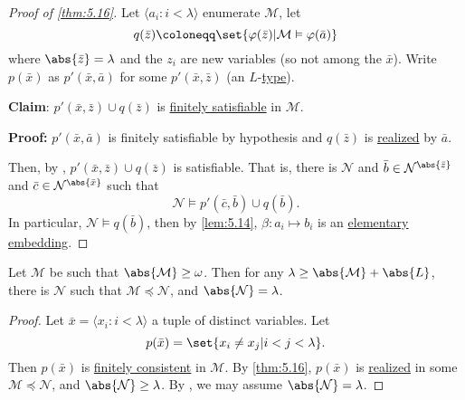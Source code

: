 \documentclass{article}
\let\models\vDash
\begin{document}
\begin{proof}[Proof of \cref{thm:5.16}]
  Let $\langle a_i : i < \lambda \rangle$ enumerate $\mathcal{M}$, let
  \begin{equation*}q(\bar{z}) \coloneqq \set{\varphi(\bar{z}) | \mathcal{M} \models \varphi(\bar{a})}\end{equation*}
  where $\abs{\bar{z}} = \lambda$ and the $z_i$ are new variables (so not among the $\bar{x}$).
  Write $p(\bar{x})$ as $p'(\bar{x}, \bar{a})$ for some $p'(\bar{x}, \bar{z})$ (an $L$-\hyperlink{def:type}{type}).

  \textbf{Claim}: $p'(\bar{x},\bar{z}) \cup q(\bar{z})$ is \hyperlink{def:type}{finitely satisfiable} in $\mathcal{M}$.

  \textbf{Proof:} $p'(\bar{x},\bar{a})$ is finitely satisfiable by hypothesis and $q(\bar{z})$ is \hyperlink{def:type}{realized} by $\bar{a}$.

  Then, by , $p'(\bar{x}, \bar{z}) \cup q(\bar{z})$ is satisfiable.
  That is, there is $\mathcal{N}$ and $\bar{b} \in \mathcal{N}^{\abs{\bar{z}}}$ and $\bar{c} \in \mathcal{N}^{\abs{\bar{x}}}$ such that
  \begin{equation*}
    \mathcal{N} \models p'(\bar{c}, \bar{b}) \cup q(\bar{b}).
  \end{equation*}
  In particular, $\mathcal{N} \models q(\bar{b})$, then by \cref{lem:5.14}, $\beta: a_i \mapsto b_i$ is an \hyperlink{def:el}{elementary embedding}.
\end{proof}
\begin{nthm}\label{thm:5.17}
  Let $\mathcal{M}$ be such that $\abs{\mathcal{M}} \geq \omega$.
  Then for any $\lambda \geq \abs{\mathcal{M}} + \abs{L}$, there is $\mathcal{N}$ such that \hyperlink{def:elsubs}{$\mathcal{M} \preccurlyeq \mathcal{N}$}, and $\abs{\mathcal{N}} = \lambda$.
\end{nthm}
\begin{proof}
  Let $\bar{x} = \langle x_i : i < \lambda \rangle$ a tuple of distinct variables.
  Let
  \begin{equation*}
    p(\bar{x}) = \set{x_i \neq x_j | i < j < \lambda}.
  \end{equation*}
  Then $p(\bar{x})$ is \hyperlink{def:type}{finitely consistent} in $\mathcal{M}$.
  By \cref{thm:5.16}, $p(\bar{x})$ is \hyperlink{def:type}{realized} in some $\mathcal{M} \preccurlyeq \mathcal{N}$, and $\abs{\mathcal{N}} \geq \lambda$.
  By , we may assume $\abs{\mathcal{N}} = \lambda$.
\end{proof}
\end{document}
